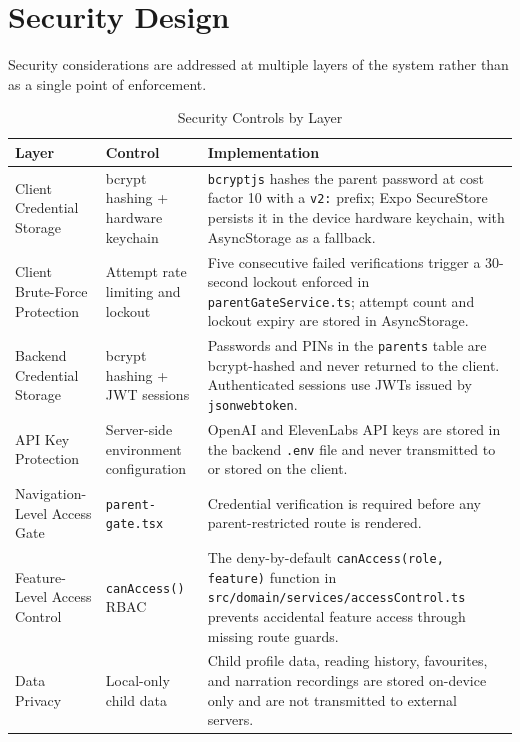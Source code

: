 \section{Security Design}

Security considerations are addressed at multiple layers of the system rather than as a single point of enforcement.

\begin{table}[H]
\centering
\caption{Security Controls by Layer}
\label{tab:security}
\renewcommand{\arraystretch}{1.4}
\begin{tabularx}{\textwidth}{|>{\RaggedRight\arraybackslash}p{3.5cm}|>{\RaggedRight\arraybackslash}p{3.5cm}|>{\RaggedRight\arraybackslash}X|}
\hline
\textbf{Layer} & \textbf{Control} & \textbf{Implementation} \\
\hline
Client Credential Storage & bcrypt hashing + hardware keychain & \texttt{bcryptjs} hashes the parent password at cost factor 10 with a \texttt{v2:} prefix; Expo SecureStore persists it in the device hardware keychain, with AsyncStorage as a fallback. \\
\hline
Client Brute-Force Protection & Attempt rate limiting and lockout & Five consecutive failed verifications trigger a 30-second lockout enforced in \texttt{parentGateService.ts}; attempt count and lockout expiry are stored in AsyncStorage. \\
\hline
Backend Credential Storage & bcrypt hashing + JWT sessions & Passwords and PINs in the \texttt{parents} table are bcrypt-hashed and never returned to the client. Authenticated sessions use JWTs issued by \texttt{jsonwebtoken}. \\
\hline
API Key Protection & Server-side environment configuration & OpenAI and ElevenLabs API keys are stored in the backend \texttt{.env} file and never transmitted to or stored on the client. \\
\hline
Navigation-Level Access Gate & \texttt{parent-gate.tsx} & Credential verification is required before any parent-restricted route is rendered. \\
\hline
Feature-Level Access Control & \texttt{canAccess()} RBAC & The deny-by-default \texttt{canAccess(role, feature)} function in \texttt{src/domain/services/accessControl.ts} prevents accidental feature access through missing route guards. \\
\hline
Data Privacy & Local-only child data & Child profile data, reading history, favourites, and narration recordings are stored on-device only and are not transmitted to external servers. \\
\hline
\end{tabularx}
\end{table}
